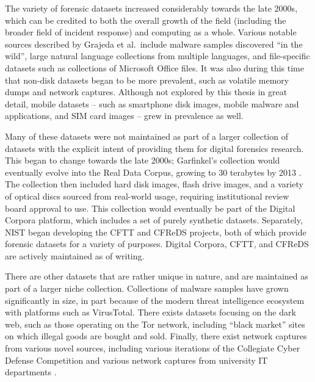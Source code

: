 The variety of forensic datasets increased considerably towards the late
2000s, which can be credited to both the overall growth of the field
(including the broader field of incident response) and computing as a
whole. Various notable sources described by Grajeda et al.~include
malware samples discovered ``in the wild'', large natural language
collections from multiple languages, and file-specific datasets such as
collections of Microsoft Office files. It was also during this time that
non-disk datasets began to be more prevalent, such as volatile memory
dumps and network captures. Although not explored by this thesis in
great detail, mobile datasets -- such as smartphone disk images, mobile
malware and applications, and SIM card images -- grew in prevalence as
well.

Many of these datasets were not maintained as part of a larger
collection of datasets with the explicit intent of providing them for
digital forensics research. This began to change towards the late 2000s;
Garfinkel's collection would eventually evolve into the Real Data
Corpus, growing to 30 terabytes by 2013
\cite{garfinkelBringingScienceDigital2009a,yannikosDataCorporaDigital2014}.
The collection then included hard disk images, flash drive images, and a
variety of optical discs sourced from real-world usage, requiring
institutional review board approval to use. This collection would
eventually be part of the Digital Corpora platform, which includes a set
of purely synthetic datasets. Separately, NIST began developing the CFTT
and CFReDS projects, both of which provide forensic datasets for a
variety of purposes. Digital Corpora, CFTT, and CFReDS are actively
maintained as of writing.

There are other datasets that are rather unique in nature, and are
maintained as part of a larger niche collection. Collections of malware
samples have grown significantly in size, in part because of the modern
threat intelligence ecosystem with platforms such as VirusTotal. There
exists datasets focusing on the dark web, such as those operating on the
Tor network, including ``black market'' sites on which illegal goods are
bought and sold. Finally, there exist network captures from various
novel sources, including various iterations of the Collegiate Cyber
Defense Competition and various network captures from university IT
departments \cite{grajedaAvailabilityDatasetsDigital2017}.


